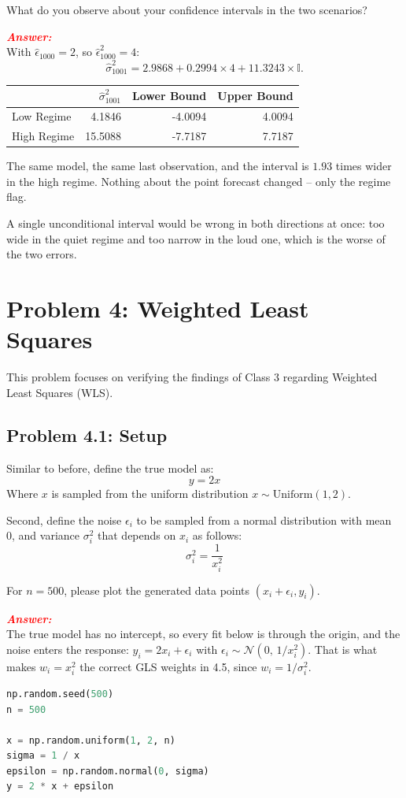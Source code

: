 \documentclass[11pt, letterpaper]{article}
\newcommand{\problem}[1]{\section*{Problem #1}}
\newcommand{\subproblem}[1]{\subsection*{Problem #1}}
\newcommand{\answer}{\textbf{\textit{\textcolor{red}{Answer:}}}\\}
\begin{document}
What do you observe about your confidence intervals in the two scenarios?

\answer
With $\hat{\epsilon}_{1000} = 2$, so $\hat{\epsilon}_{1000}^2 = 4$:
$$
\hat{\sigma}_{1001}^2 = 2.9868 + 0.2994 \times 4 + 11.3243 \times \mathbb{I}.
$$

\begin{center}
\begin{tabular}{lrrr}
\toprule
 & $\hat{\sigma}^2_{1001}$ & Lower Bound & Upper Bound \\
\midrule
Low Regime & 4.1846 & -4.0094 & 4.0094 \\
High Regime & 15.5088 & -7.7187 & 7.7187 \\
\bottomrule
\end{tabular}
\end{center}

The same model, the same last observation, and the interval is $1.93$ times wider in the high
regime. Nothing about the point forecast changed -- only the regime flag.

A single unconditional interval would be wrong in both directions at once: too wide in the quiet
regime and too narrow in the loud one, which is the worse of the two errors.


\problem{4: Weighted Least Squares}

This problem focuses on verifying the findings of Class 3 regarding
Weighted Least Squares (WLS).

\subproblem{4.1: Setup}

Similar to before, define the true model as:
$$
y = 2x
$$
Where $x$ is sampled from the uniform distribution $x \sim \text{Uniform}(1, 2)$.

Second, define the noise $\epsilon_i$ to be sampled from a normal distribution with mean 0,
and variance $\sigma_i^2$ that depends on $x_i$ as follows:
$$
\sigma_i^2 = \frac{1}{x_i^2}
$$

For $n=500$, please plot the generated data points $(x_i + \epsilon_i, y_i)$.

\answer
The true model has no intercept, so every fit below is through the origin, and the noise enters the
response: $y_i = 2 x_i + \epsilon_i$ with $\epsilon_i \sim \mathcal{N}(0,\, 1/x_i^2)$. That is what
makes $w_i = x_i^2$ the correct GLS weights in 4.5, since $w_i = 1/\sigma_i^2$.

\begin{lstlisting}[language=Python]
np.random.seed(500)
n = 500

x = np.random.uniform(1, 2, n)
sigma = 1 / x
epsilon = np.random.normal(0, sigma)
y = 2 * x + epsilon
\end{lstlisting}
\end{document}
